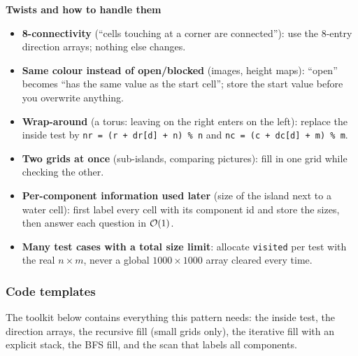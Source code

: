 \textbf{Twists and how to handle them}
\begin{itemize}[leftmargin=*]
    \item \textbf{8-connectivity} (``cells touching at a corner are connected''): use the 8-entry direction arrays; nothing else changes.
    \item \textbf{Same colour instead of open/blocked} (images, height maps): ``open'' becomes ``has the same value as the start cell''; store the start value before you overwrite anything.
    \item \textbf{Wrap-around} (a torus: leaving on the right enters on the left): replace the inside test by \texttt{nr = (r + dr[d] + n) \% n} and \texttt{nc = (c + dc[d] + m) \% m}.
    \item \textbf{Two grids at once} (sub-islands, comparing pictures): fill in one grid while checking the other.
    \item \textbf{Per-component information used later} (size of the island next to a water cell): first label every cell with its component id and store the sizes, then answer each question in $\mathcal{O}(1)$.
    \item \textbf{Many test cases with a total size limit}: allocate \texttt{visited} per test with the real $n\times m$, never a global $1000\times1000$ array cleared every time.
\end{itemize}

\subsubsection*{Code templates}

The toolkit below contains everything this pattern needs: the inside test, the direction arrays, the recursive fill (small grids only), the iterative fill with an explicit stack, the BFS fill, and the scan that labels all components.

